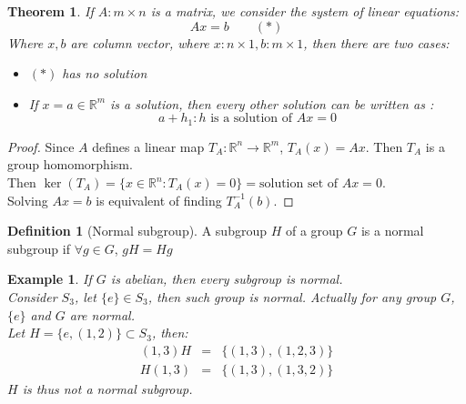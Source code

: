 \documentclass{article}
\theoremstyle{MyNonumberplain}
\theoremstyle{break}
\newtheorem*{proof}{Proof. }
\theoremstyle{break}
\newtheorem{theorem}{Theorem}[section]
\newtheorem{example}{Example}[section]
\theoremstyle{break}
\theoremstyle{definition}
\theoremstyle{break}
\newtheorem{definition}{Definition}[section]
\begin{document}
\begin{thmbox}
    \begin{theorem}
        If $A : m \times n$ is a matrix, we consider the system of linear equations:
        \[ A x = b \qquad (\ast) \]
        Where $x, b$ are column vector, where $x : n \times 1, b : m \times 1$, then
        there are two cases:\\
        \begin{itemize}
        \item $(\ast)$ has no solution\\
        
        \item If $x = a \in \mathbb{R}^m$ is a solution, then every other solution
        can be written as :
        \[ a + h_1 : h \text{ is a solution of $A x = 0$} \]
        \end{itemize}
    \end{theorem}
    \begin{prfbox}
        \begin{proof}
            Since $A$ defines a linear map $T_A : \mathbb{R}^n \rightarrow
            \mathbb{R}^m$, $T_A (x) = A x$. Then $T_A$ is a group homomorphism.\\

            Then $\ker (T_A) = \{ x \in \mathbb{R}^n : T_A (x) = 0 \} = \text{solution set
            of $A x = 0$}$.\\

            Solving $A x = b$ is equivalent of finding $T^{- 1}_A (b)$. 
        \end{proof}
    \end{prfbox}
\end{thmbox}

\begin{defbox}
    \begin{definition}[Normal subgroup]
        A subgroup $H$ of a group $G$ is a normal subgroup if $\forall g \in G$, $g H = H g$
    \end{definition}
\end{defbox}

\begin{expbox}
    \begin{example}
        If $G$ is abelian, then every subgroup is normal.\\

        Consider $S_3$, let $\{ e \} \in S_3$, then such group is normal. Actually
        for any group $G$, $\{ e \}$ and $G$ are normal.\\

        Let $H = \{ e, (1, 2) \} \subset S_3$, then:
        \begin{eqnarray*}
        (1, 3) H & = & \{ (1, 3), (1, 2, 3) \}\\
        H (1, 3) & = & \{ (1, 3), (1, 3, 2) \}
        \end{eqnarray*}
        $H$ is thus not a normal subgroup.
    \end{example}
\end{expbox}
\end{document}
